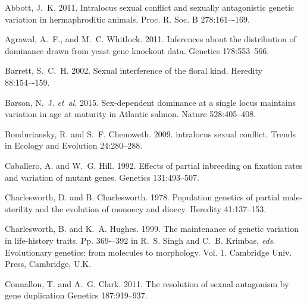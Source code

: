 \documentclass{article}
\begin{document}
\begin{thebibliography}{}

Abbott, J.~K. 2011.
\newblock Intralocus sexual conflict and sexually antagonistic genetic variation in hermaphroditic animals.
\newblock Proc. R. Soc. B 278:161–-169.

Agrawal, A.~F., and M.~C. Whitlock. 2011.
\newblock Inferences about the distribution of dominance drawn from yeast gene knockout data.
\newblock Genetics 178:553--566.

Barrett, S.~C.~H. 2002.
\newblock Sexual interference of the floral kind.
\newblock Heredity 88:154–-159.

Barson, N.~J. \textit{et~al}. 2015.
\newblock Sex-dependent dominance at a single locus maintains variation in age at maturity in Atlantic salmon.
\newblock Nature 528:405--408.

Bonduriansky, R. and S.~F. Chenoweth. 2009.
\newblock intralocus sexual conflict.
\newblock Trends in Ecology and Evolution 24:280--288.

Caballero, A. and W.~G. Hill. 1992.
\newblock Effects of partial inbreeding on fixation rates and variation of mutant genes.
\newblock Genetics 131:493--507.

Charlesworth, D. and B. Charlesworth. 1978.
\newblock Population genetics of partial male-sterility and the evolution of monoecy and dioecy.
\newblock Heredity 41:137--153.

Charlesworth, B. and K.~A. Hughes. 1999.
\newblock The maintenance of genetic variation in life-history traits.
\newblock Pp. 369-–392 in R.~S. Singh and C.~B. Krimbas, \textit{eds}. Evolutionary genetics: from molecules to morphology. Vol. 1. Cambridge Univ. Press, Cambridge, U.K.

Connallon, T. and A.~G. Clark. 2011.
\newblock The resolution of sexual antagonism by gene duplication
\newblock Genetics 187:919--937.


\end{thebibliography}
\end{document}
